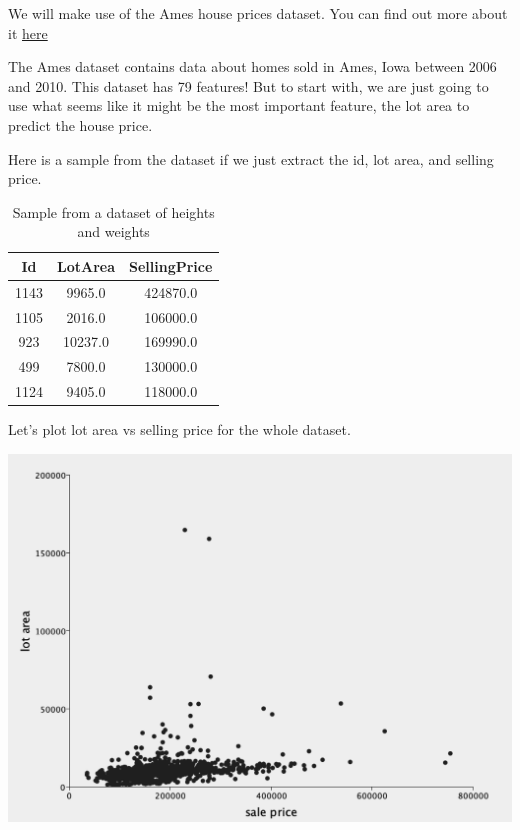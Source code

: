 \documentclass[12pt]{article}
\begin{document}
We will make use of the Ames house prices dataset. You can find out more about it \href{https://www.kaggle.com/c/house-prices-advanced-regression-techniques/data}{here}

The Ames dataset contains data about homes sold in Ames, Iowa between 2006 and 2010. This dataset has 79 features! But to start with, we are just going to use what seems like it might be the most important feature, the lot area to predict the house price.

Here is a sample from the dataset if we just extract the id, lot area, and selling price.
\begin{table}[htp]
\caption{Sample from a dataset of heights and weights}
\begin{center}
\begin{tabular}{|c|c|c|}
\hline
Id & LotArea & SellingPrice  \\ \hline
1143 & 9965.0 & 424870.0 \\
1105 & 2016.0 & 106000.0 \\
923 & 10237.0 & 169990.0 \\
499& 7800.0 & 130000.0 \\
1124 & 9405.0 & 118000.0 \\
\hline
\end{tabular}
\end{center}
\label{Sample from the Ames housing prices dataset.}
\end{table}%

Let's plot lot area vs selling price for the whole dataset.

\includegraphics[width={\textwidth}]{ames-training-set}
\end{document}
